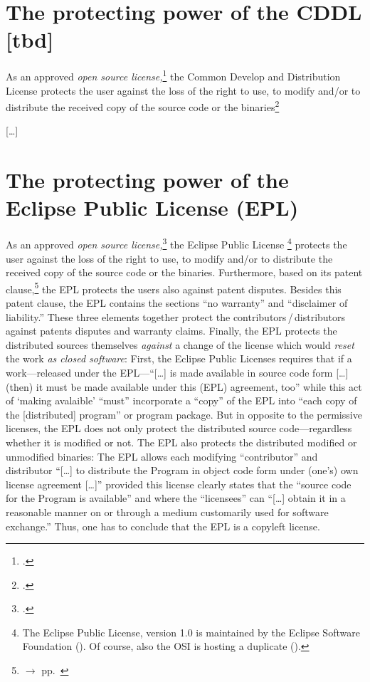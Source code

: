 \section{\texorpdfstring{The protecting power of the}{The} CDDL [tbd]}

As an approved \emph{open source license,}\footcite[cf.][\nopage wp]{OSI2012b}
the Common Develop and Distribution License protects the user
against the loss of the right to use, to modify and/or to distribute the
received copy of the source code or the binaries\footcite[cf.][\nopage wp. 
§?]{Cddl10OsiLicense2004a}

[\ldots]

\section{\texorpdfstring{The protecting power of the}{The} Eclipse Public License (EPL)}

As an approved \emph{open source license,}\footcite[cf.][\nopage wp]{OSI2012b}
the Eclipse Public License%
  \footnote{The Eclipse Public License, version 1.0 is maintained by the Eclipse
  Software Foundation (\cite[cf.][\nopage wp]{Epl10EclipseFoundation2005a}).
  Of course, also the OSI is hosting a duplicate (\cite[cf.][\nopage
  wp]{Epl10OsiLicense2005a}).} 
protects the user against the loss of the right to use, to modify and/or to
distribute the received copy of the source code or the binaries. 
Furthermore, based on its patent clause,\footnote{$\rightarrow$ \oslic{} 
pp.\ } the EPL protects the users also against
patent disputes. Besides this patent clause, the EPL contains the
sections \enquote{no warranty} and \enquote{disclaimer of
liability.} These three elements together protect the
contributors\,/\,distributors against patents disputes and warranty
claims. Finally, the EPL protects the distributed sources themselves
\emph{against} a change of the license which would \emph{reset} the work
\emph{as closed software}: First, the Eclipse Public Licenses requires that 
if a work---released under the EPL---\enquote{[\ldots] is made available in
source code form [\ldots] (then) it must be made available under this (EPL)
agreement, too} while this act of `making avalaible' \enquote{must} incorporate
a \enquote{copy} of the EPL into \enquote{each copy of the [distributed]
program} or program package. But in opposite to the permissive
licenses, the EPL does not only protect the distributed source code---regardless
whether it is modified or not. The EPL also protects the distributed modified or
unmodified binaries: The EPL allows each modifying \enquote{contributor} and
distributor \enquote{[\ldots] to distribute the Program in object code form
under (one's) own license agreement [\ldots]} provided this license clearly
states that the \enquote{source code for the Program is available} and where the
\enquote{licensees} can \enquote{[\ldots] obtain it in a reasonable manner on or
through a medium customarily used for software exchange.}
Thus, one has to conclude that the EPL is a copyleft license.


